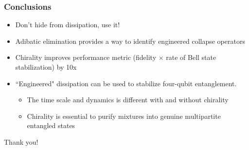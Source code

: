\documentclass{beamer}
\begin{document}
\begin{frame}
\frametitle{Conclusions}
\begin{itemize}
\item Don't hide from dissipation, use it!
\item Adibatic elimination provides a way to identify engineered collapse operators
\item Chirality improves performance metric (fidelity $\times$ rate of Bell state stabilization) by 10x 
\item ``Engineered" dissipation can be used to stabilize four-qubit entanglement.
\begin{itemize}
\item The time scale and dynamics is different with and without chirality
\item Chirality is essential to purify mixtures into genuine multipartite entangled states
\end{itemize}
\end{itemize}
\end{frame}

\begin{frame}
\centering
\Huge Thank you!
\end{frame}
\end{document}
